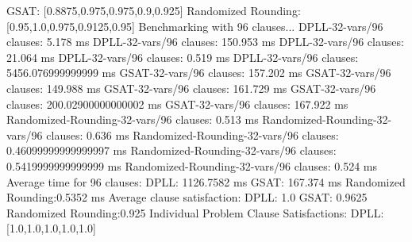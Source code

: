 \documentclass{article}
\begin{document}
  GSAT:               [0.8875,0.975,0.975,0.9,0.925]\newline
  Randomized Rounding:[0.95,1.0,0.975,0.9125,0.95]\newline
\newline
\newline
Benchmarking with 96 clauses...\newline
DPLL-32-vars/96 clauses: 5.178 ms\newline
DPLL-32-vars/96 clauses: 150.953 ms\newline
DPLL-32-vars/96 clauses: 21.064 ms\newline
DPLL-32-vars/96 clauses: 0.519 ms\newline
DPLL-32-vars/96 clauses: 5456.076999999999 ms\newline
GSAT-32-vars/96 clauses: 157.202 ms\newline
GSAT-32-vars/96 clauses: 149.988 ms\newline
GSAT-32-vars/96 clauses: 161.729 ms\newline
GSAT-32-vars/96 clauses: 200.02900000000002 ms\newline
GSAT-32-vars/96 clauses: 167.922 ms\newline
Randomized-Rounding-32-vars/96 clauses: 0.513 ms\newline
Randomized-Rounding-32-vars/96 clauses: 0.636 ms\newline
Randomized-Rounding-32-vars/96 clauses: 0.46099999999999997 ms\newline
Randomized-Rounding-32-vars/96 clauses: 0.5419999999999999 ms\newline
Randomized-Rounding-32-vars/96 clauses: 0.524 ms\newline
Average time for 96 clauses:\newline
  DPLL:               1126.7582 ms\newline
  GSAT:               167.374 ms\newline
  Randomized Rounding:0.5352 ms\newline
Average clause satisfaction:\newline
  DPLL:               1.0\newline
  GSAT:               0.9625\newline
  Randomized Rounding:0.925\newline
\newline
Individual Problem Clause Satisfactions:\newline
  DPLL:               [1.0,1.0,1.0,1.0,1.0]\newline
\end{document}

